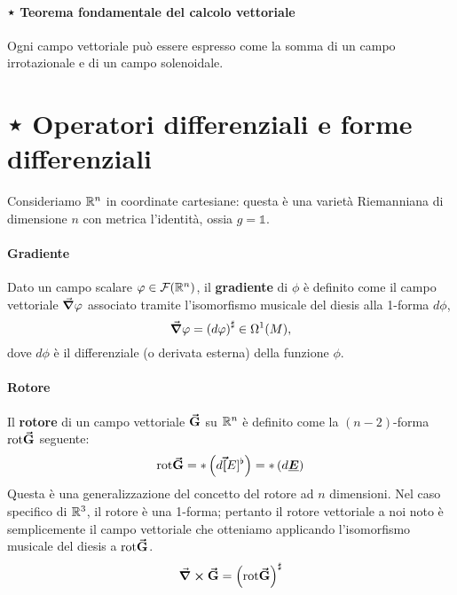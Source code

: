 \paragraph{⋆ Teorema fondamentale del calcolo vettoriale}
\begin{theoremaqed}
	Ogni campo vettoriale può essere espresso come la somma di un campo irrotazionale e di un campo solenoidale.
\end{theoremaqed}
\section{⋆ Operatori differenziali e forme differenziali}
Consideriamo $\mathbb{R}^n$ in coordinate cartesiane: questa è una varietà Riemanniana di dimensione $n$ con metrica l'identità, ossia $g=\mathbb{1}$.\\
\paragraph{Gradiente}
Dato un campo scalare $\varphi\in\mathcal{F}(\mathbb{R}^n)$, il \textbf{gradiente} di $\phi$ è definito come il campo vettoriale $\grad{\varphi}$ associato tramite l'isomorfismo musicale del diesis alla 1-forma $d\phi$,
\begin{equation}
	\grad{\varphi}=\left(d\varphi\right)^{\sharp}\in\Omega^1(M),
\end{equation}
dove $d\phi$ è il differenziale (o derivata esterna) della funzione $\phi$.
\paragraph{Rotore}
Il \textbf{rotore} di un campo vettoriale $\vb*{\va{G}}$ su $\mathbb{R}^n$ è definito come la $(n-2)$-forma $\mathrm{rot}\vb*{\va{G}}$ seguente:
\begin{equation*}
	\mathrm{rot}\vb*{\va{G}}=\ast\left(d\vb*{\va{[}}E]^\flat\right)=\ast\left(d\vb*{\underline{E}}\right)
\end{equation*}
Questa è una generalizzazione del concetto del rotore ad $n$ dimensioni. Nel caso specifico di $\mathbb{R}^3$, il rotore è una 1-forma; pertanto il rotore vettoriale a noi noto è semplicemente il campo vettoriale che otteniamo applicando l'isomorfismo musicale del diesis a $\mathrm{rot}\vb*{\va{G}}$.
\begin{equation}
	\curl{\vb*{\va{G}}}=\left(\mathrm{rot}\vb*{\va{G}}\right)^\sharp
\end{equation}
